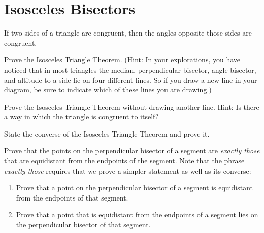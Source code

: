 \newpage

\section{Isosceles Bisectors}

\begin{theorem}
If two sides of a triangle are congruent, then the angles opposite those sides are congruent. 
\end{theorem}

\begin{prob}
Prove the Isosceles Triangle Theorem.  (Hint: In your explorations, you have noticed that in most triangles the median, perpendicular bisector, angle bisector, and altitude to a side lie on four different lines.  So if you draw a new line in your diagram, be sure to indicate which of these lines you are drawing.)
\end{prob}


\begin{prob}
Prove the Isosceles Triangle Theorem without drawing another line.  Hint:  Is there a way in which the triangle is congruent to itself? 
\end{prob}

\begin{prob}
State the converse of the Isosceles Triangle Theorem and prove it.  
\end{prob}

\begin{prob}
Prove that the points on the perpendicular bisector of a segment are \emph{exactly those} that are equidistant from the endpoints of the segment.  Note that the phrase \emph{exactly those} requires that we prove a simpler statement as well as its converse:   
\begin{enumerate}
\item Prove that a point on the perpendicular bisector of a segment is equidistant from the endpoints of that segment.
\item Prove that a point that is equidistant from the endpoints of a segment lies on the perpendicular bisector of that segment.
\end{enumerate}
\end{prob}

